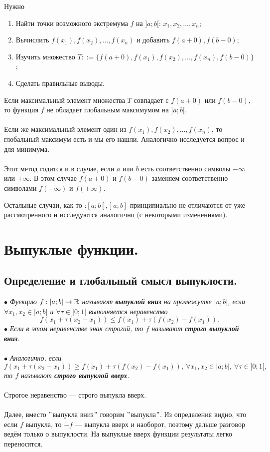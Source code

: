 \begin{enumerate}
	Нужно
	\begin{enumerate}
		\item Найти точки возможного экстремума $f$ на $]a;b[$: $x_1, x_2, \ldots, x_n$;
		\item Вычислить $f(x_1), f(x_2), \ldots, f(x_n)$ и добавить $f(a + 0), f(b - 0)$;
		\item Изучить множество $T::=\{f(a + 0),f(x_1), f(x_2), \ldots, f(x_n), f(b - 0)\}$;
		\item Сделать правильные выводы.
	\end{enumerate}
	Если максимальный элемент множества $T$ совпадает с $f(a + 0)$ или $f(b - 0)$, то функция $f$ не обладает глобальным максимумом на $]a;b[$.\\\\
	Если же максимальный элемент один из $f(x_1), f(x_2), \ldots, f(x_n)$, то глобальный максимум есть и мы его нашли. Аналогично исследуется вопрос и для минимума.\\\\
	Этот метод годится и в случае, если $a$ или $b$ есть соответственно символы $-\infty$ или $+\infty$. В этом случае $f(a + 0)$ и $f(b - 0)$ заменяем соответственно символами $f(-\infty)$ и $f(+\infty)$.
\end{enumerate}
Остальные случаи, как-то :$[a;b[, ]a;b]$ принципиально не отличаются от уже рассмотренного и исследуются аналогично (с некоторыми изменениями).
\section{Выпуклые функции.}
\subsection{Определение и глобальный смысл выпуклости.}
$\bullet$ \textit{Фуекцию $f: |a;b| \rightarrow \mathbb{R}$ называют \textbf{выпуклой вниз} на промежутке $|a;b|$, если $\forall x_1, x_2 \in |a;b|$ и $\forall \tau \in ]0;1[$ выполняется неравенство
	$$f(x_1 + \tau(x_2 - x_1)) \le f(x_1) + \tau(f(x_2) - f(x_1)).$$}
$\bullet$ \textit{Если в этом неравенстве знак строгий, то $f$ называют \textbf{строго выпуклой вниз}.}\\\\
$\bullet$ \textit{Аналогично, если
	$$f(x_1 + \tau(x_2 - x_1)) \ge f(x_1) + \tau(f(x_2) - f(x_1)),\ \forall x_1, x_2 \in |a;b|,\ \forall \tau \in ]0;1[,$$ то $f$ называют \textbf{строго выпуклой вверх}. }\\\\
Строгое неравенство --- строго выпукла вверх.\\\\
Далее, вместо $"$выпукла вниз$"$ говорим $"$выпукла$"$.
Из определения видно, что если $f$ выпукла, то $-f$ --- выпукла вверх и наоборот, поэтому дальше разговор ведём только о выпуклости. На выпуклые вверх функции результаты легко переносятся.   
